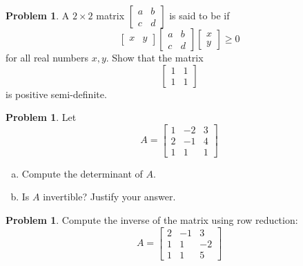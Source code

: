 \documentclass[10pt]{article}
\theoremstyle{definition}
\newtheorem{problem}[theorem]{Problem}
\newcommand{\1}[1]{\textbf{1}_{\left[#1\right]}} %
\newcommand{\dempfcolor}[1]{{\color{RoyalBlue}#1}}
\newcommand{\demph}[1]{\dempfcolor{{\sl #1}}}
\begin{document}
\begin{problem}
  A $2\times 2$ matrix $
  \begin{bmatrix}
    a&b\\
    c&d
  \end{bmatrix}
  $ is said to be \demph{positive semi-definite} if
  \begin{equation*}
    \begin{bmatrix}
      x&y
    \end{bmatrix}
    \begin{bmatrix}
      a&b\\
      c&d
    \end{bmatrix}
    \begin{bmatrix}
      x\\y
    \end{bmatrix}\geq 0
  \end{equation*}
  for all real numbers $x,y$. Show that the matrix
  \begin{equation*}
    \begin{bmatrix}
      1&1\\
      1&1
    \end{bmatrix}
  \end{equation*}
  is positive semi-definite.
\end{problem}

\begin{problem}
  Let
  \begin{equation*}
    A = \begin{bmatrix}
      1&-2&3\\
      2&-1&4\\
      1&1&1
    \end{bmatrix}
  \end{equation*}
  \begin{enumerate}[(a)]
    \item Compute the determinant of $A$.
    \item Is $A$ invertible? Justify your answer.
  \end{enumerate}
\end{problem}

\begin{problem}
  Compute the inverse of the matrix using row reduction:
  \begin{equation*}
    A =
    \begin{bmatrix}
      2&-1&3\\
      1&1&-2\\
      1&1&5
    \end{bmatrix}
  \end{equation*}
\end{problem}
\end{document}
